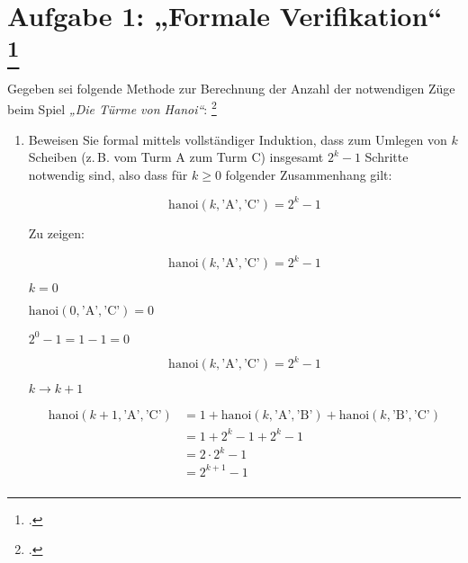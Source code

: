 \documentclass{lehramt-informatik-minimal}
\begin{document}
\section{Aufgabe 1: „Formale Verifikation“
\footcite[46116 – Frühjahr 2014 – Thema 2, TA 1, Aufgabe 1]{examen:46116:2014:03}}

Gegeben sei folgende Methode zur Berechnung der Anzahl der notwendigen
Züge beim Spiel \emph{„Die Türme von Hanoi“}:
\footcite{sosy:pu:5:1}


\begin{enumerate}


\item Beweisen Sie formal mittels vollständiger Induktion, dass zum
Umlegen von $k$ Scheiben (z.\,B. vom Turm A zum Turm C) insgesamt
$2^k-1$ Schritte notwendig sind, also dass für $k \geq 0$ folgender
Zusammenhang gilt:

\begin{displaymath}
\text{hanoi}(k,\text{'A'},\text{'C'}) = 2^k - 1
\end{displaymath}

\begin{antwort}
Zu zeigen:

\begin{displaymath}
\text{hanoi}(k,\text{'A'},\text{'C'}) = 2^k - 1
\end{displaymath}

%

 $k=0$

$\text{hanoi}(0,\text{'A'},\text{'C'}) = 0$

$2^0 - 1 = 1 - 1 = 0$

%


\begin{displaymath}
\text{hanoi}(k,\text{'A'},\text{'C'}) = 2^k - 1
\end{displaymath}

%

 $k \rightarrow k + 1$

\begin{align*}
\text{hanoi}(k +  1, \text{'A'},\text{'C'})
& = 1 + \text{hanoi}(k, \text{'A'},\text{'B'}) + \text{hanoi}(k, \text{'B'},\text{'C'})\\
& = 1 + 2^k - 1 +  2^k - 1 \\
& = 2 \cdot 2^k - 1 \\
& = 2^{k+1} - 1 \\
\end{align*}


\end{antwort}
\end{enumerate}
\end{document}

